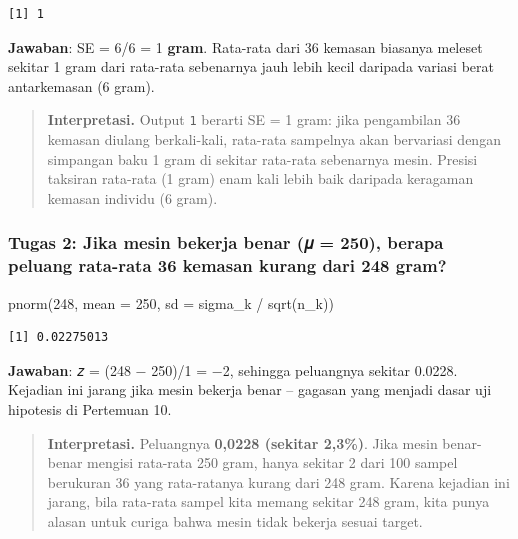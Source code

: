 \documentclass[
  indonesian,
  letterpaper,
]{book}
\newenvironment{Shaded}{\begin{snugshade}}{\end{snugshade}}
\newcommand{\AttributeTok}[1]{\textcolor[rgb]{0.40,0.45,0.13}{#1}}
\newcommand{\DecValTok}[1]{\textcolor[rgb]{0.68,0.00,0.00}{#1}}
\newcommand{\FunctionTok}[1]{\textcolor[rgb]{0.28,0.35,0.67}{#1}}
\newcommand{\NormalTok}[1]{\textcolor[rgb]{0.00,0.23,0.31}{#1}}
\newcommand{\SpecialCharTok}[1]{\textcolor[rgb]{0.37,0.37,0.37}{#1}}
\begin{document}
\begin{verbatim}
[1] 1
\end{verbatim}

\textbf{Jawaban}: SE = 6/6 = 1 \textbf{gram}. Rata-rata dari 36 kemasan
biasanya meleset sekitar 1 gram dari rata-rata sebenarnya jauh lebih
kecil daripada variasi berat antarkemasan (6 gram).

\begin{quote}
\textbf{Interpretasi.} Output \texttt{1} berarti SE = 1 gram: jika
pengambilan 36 kemasan diulang berkali-kali, rata-rata sampelnya akan
bervariasi dengan simpangan baku 1 gram di sekitar rata-rata sebenarnya
mesin. Presisi taksiran rata-rata (1 gram) enam kali lebih baik daripada
keragaman kemasan individu (6 gram).
\end{quote}

\subsubsection{Tugas 2: Jika mesin bekerja benar (𝜇 = 250), berapa
peluang rata-rata 36 kemasan kurang dari 248
gram?}\label{tugas-2-jika-mesin-bekerja-benar-ux1d707-250-berapa-peluang-rata-rata-36-kemasan-kurang-dari-248-gram}

\begin{Shaded}
\begin{Highlighting}[]
\FunctionTok{pnorm}\NormalTok{(}\DecValTok{248}\NormalTok{, }\AttributeTok{mean =} \DecValTok{250}\NormalTok{, }\AttributeTok{sd =}\NormalTok{ sigma\_k }\SpecialCharTok{/} \FunctionTok{sqrt}\NormalTok{(n\_k))}
\end{Highlighting}
\end{Shaded}

\begin{verbatim}
[1] 0.02275013
\end{verbatim}

\textbf{Jawaban}: 𝑧 = (248 − 250)/1 = −2, sehingga peluangnya sekitar
0.0228. Kejadian ini jarang jika mesin bekerja benar -- gagasan yang
menjadi dasar uji hipotesis di Pertemuan 10.

\begin{quote}
\textbf{Interpretasi.} Peluangnya \textbf{0,0228 (sekitar 2,3\%)}. Jika
mesin benar-benar mengisi rata-rata 250 gram, hanya sekitar 2 dari 100
sampel berukuran 36 yang rata-ratanya kurang dari 248 gram. Karena
kejadian ini jarang, bila rata-rata sampel kita memang sekitar 248 gram,
kita punya alasan untuk curiga bahwa mesin tidak bekerja sesuai target.
\end{quote}
\end{document}
